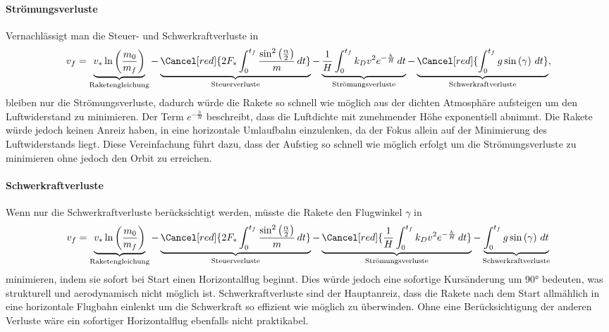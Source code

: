 \paragraph{Strömungsverluste} Vernachlässigt man die Steuer- und Schwerkraftverluste in  
\begin{equation*}
	v_f = \underbrace{v_* \ln \left(\frac{m_0}{m_f}\right)}_{\text{Raketengleichung}} 
	- \underbrace{\Cancel[red]{2F_* \int_0^{t_f} \frac{\sin^2\left(\frac{\alpha}{2}\right)}{m} \, dt }}_{\text{Steuerverluste}}
	- \underbrace{\frac{1}{H} \int_0^{t_f} k_Dv^2 e^{-\frac{h}{H}} \, dt }_{\text{Strömungsverluste}}
	- \underbrace{\Cancel[red]{\int_0^{t_f} g \sin \left(\gamma\right) \, dt}}_{\text{Schwerkraftverluste}},
\end{equation*}
bleiben nur die Strömungsverluste, dadurch würde die Rakete so schnell wie möglich aus der dichten Atmosphäre aufsteigen um den Luftwiderstand zu minimieren. 
Der Term $e^{-\frac{h}{H}}$ beschreibt, dass die Luftdichte mit zunehmender Höhe exponentiell abnimmt. 
Die Rakete würde jedoch keinen Anreiz haben, in eine horizontale Umlaufbahn einzulenken, da der Fokus allein auf der Minimierung des Luftwiderstands liegt.
Diese Vereinfachung führt dazu, dass der Aufstieg so schnell wie möglich erfolgt um die Strömungsverluste zu minimieren ohne jedoch den Orbit zu erreichen.

\paragraph{Schwerkraftverluste} Wenn nur die Schwerkraftverluste berücksichtigt werden, müsste die Rakete den Flugwinkel \(\gamma\) in
\begin{equation*}
	v_f = \underbrace{v_* \ln \left(\frac{m_0}{m_f}\right)}_{\text{Raketengleichung}} 
	- \underbrace{\Cancel[red]{2F_* \int_0^{t_f} \frac{\sin^2\left(\frac{\alpha}{2}\right)}{m} \, dt }}_{\text{Steuerverluste}}
	- \underbrace{\Cancel[red]{\frac{1}{H} \int_0^{t_f} k_Dv^2 e^{-\frac{h}{H}} \, dt }}_{\text{Strömungsverluste}}
	- \underbrace{\int_0^{t_f} g \sin \left(\gamma\right) \, dt}_{\text{Schwerkraftverluste}}
\end{equation*}
minimieren, indem sie sofort bei Start einen Horizontalflug beginnt. 
Dies würde jedoch eine sofortige Kursänderung um 90° bedeuten, was strukturell und aerodynamisch nicht möglich ist. 
Schwerkraftverluste sind der Hauptanreiz, dass die Rakete nach dem Start allmählich in eine horizontale Flugbahn einlenkt um die Schwerkraft so effizient wie möglich zu überwinden.
Ohne eine Berücksichtigung der anderen Verluste wäre ein sofortiger Horizontalflug ebenfalls nicht praktikabel.


